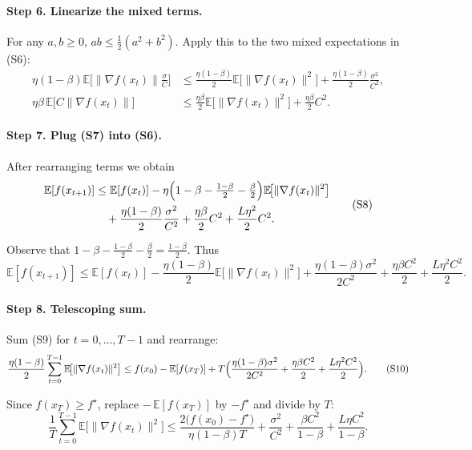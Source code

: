 \documentclass{article}
\newcommand{\E}{\mathbb{E}}
\begin{document}
\paragraph{Step 6. Linearize the mixed terms.}  
For any $a,b\ge0$, $ab\le\frac{1}{2}(a^2+b^2)$. Apply this to the two mixed expectations in (S6):
\[
\begin{aligned}
\eta(1-\beta)\E\!\bigl[\|\nabla f(x_t)\|\tfrac{\sigma}{C}\bigr]
&\le \frac{\eta(1-\beta)}{2}\E\!\bigl[\|\nabla f(x_t)\|^2\bigr]
   +\frac{\eta(1-\beta)}{2}\frac{\sigma^2}{C^2},
\\[4pt]
\eta\beta\,\E\!\bigl[ C\|\nabla f(x_t)\|\bigr]
&\le \frac{\eta\beta}{2}\E\!\bigl[\|\nabla f(x_t)\|^2\bigr]
   +\frac{\eta\beta}{2}C^2 .
\end{aligned}
\tag{S7}
\]

\paragraph{Step 7. Plug (S7) into (S6).}  
After rearranging terms we obtain
\[
\begin{aligned}
\E[f(x_{t+1})] 
&\le \E[f(x_t)]
-\eta\Bigl(1-\beta-\tfrac{1-\beta}{2}-\tfrac{\beta}{2}\Bigr)\E\!\bigl[\|\nabla f(x_t)\|^2\bigr] \\
&\quad +\frac{\eta(1-\beta)}{2}\frac{\sigma^2}{C^2}
+ \frac{\eta\beta}{2}C^2
+ \frac{L\eta^2}{2}C^2 .
\end{aligned}
\tag{S8}
\]

Observe that $1-\beta-\frac{1-\beta}{2}-\frac{\beta}{2}= \frac{1-\beta}{2}$. Thus
\[
\E[f(x_{t+1})] 
\le \E[f(x_t)]
-\frac{\eta(1-\beta)}{2}\E\!\bigl[\|\nabla f(x_t)\|^2\bigr]
+ \frac{\eta(1-\beta)\sigma^2}{2C^2}
+ \frac{\eta\beta C^2}{2}
+ \frac{L\eta^2 C^2}{2}.
\tag{S9}
\]

\paragraph{Step 8. Telescoping sum.}  
Sum (S9) for $t=0,\dots,T-1$ and rearrange:
\[
\frac{\eta(1-\beta)}{2}\sum_{t=0}^{T-1}\E\!\bigl[\|\nabla f(x_t)\|^2\bigr]
\le f(x_0)-\E[f(x_T)]
+ T\Bigl(\frac{\eta(1-\beta)\sigma^2}{2C^2}
+ \frac{\eta\beta C^2}{2}
+ \frac{L\eta^2 C^2}{2}\Bigr).
\tag{S10}
\]

Since $f(x_T)\ge f^\star$, replace $-\,\E[f(x_T)]$ by $-f^\star$ and divide by $T$:
\[
\frac{1}{T}\sum_{t=0}^{T-1}\E\!\bigl[\|\nabla f(x_t)\|^2\bigr]
\le
\frac{2\bigl(f(x_0)-f^\star\bigr)}{\eta(1-\beta)T}
+ \frac{\sigma^2}{C^2}
+ \frac{\beta C^2}{1-\beta}
+ \frac{L\eta C^2}{1-\beta}.
\tag{S11}
\]
\end{document}

